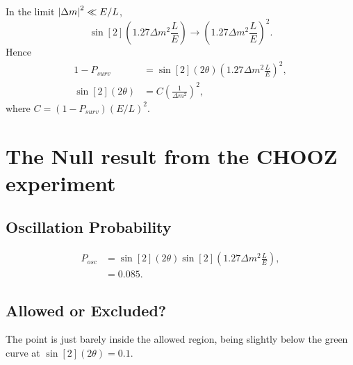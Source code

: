 \documentclass[
a4paper,
10pt,
twoside,
]{article}
\begin{document}
In the limit $\abs{\Delta m}^2 \ll E/L$,
\begin{equation}
	\sin[2](1.27 \Delta m^2 \frac{L}{E}) \rightarrow \left(1.27 \Delta m^2 \frac{L}{E}\right)^2.
\end{equation}
Hence
\begin{align}
	1-P_{surv} &= \sin[2](2\theta) \left(1.27 \Delta m^2 \frac{L}{E}\right)^2,\\
	\sin[2](2\theta) &= C \left(\frac{1}{\Delta m^2}\right)^2,
\end{align}
where $C = (1-P_{surv})(E/L)^2$.

\section{The Null result from the CHOOZ experiment}
\subsection{Oscillation Probability}
\begin{align}
	P_{osc} &= \sin[2](2\theta)\sin[2](1.27 \Delta m^2 \frac{L}{E}),\\
	&= 0.085.
\end{align}
\subsection{Allowed or Excluded?}
The point is just barely inside the allowed region, being slightly below the green curve at $\sin[2](2\theta) = 0.1$.

\nocite{*}
\printbib


\stopmcols
\end{document}
